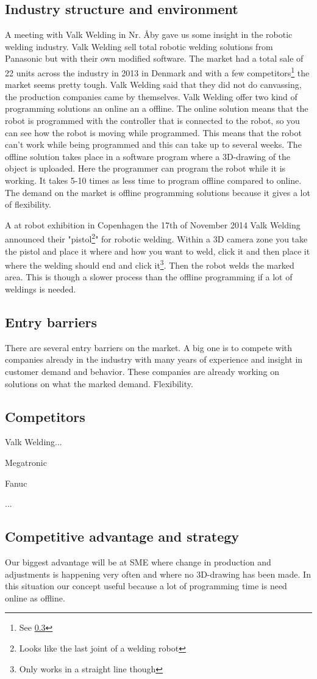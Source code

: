
\subsection{Industry structure and environment}
A meeting with Valk Welding in Nr. Åby gave us some insight in the robotic welding industry. Valk Welding sell total robotic welding solutions from Panasonic but with their own modified software. The market had  a total sale of 22 units across the industry in 2013 in Denmark and with a few competitors\footnote{See \ref{competitors}} the market seems pretty tough. Valk Welding said that they did not do canvassing, the production companies came by themselves. Valk Welding offer two kind of programming solutions an online an a offline. The online solution means that the robot is programmed with the controller that is connected to the robot, so you can see how the robot is moving while programmed. This means that the robot can't work while being programmed and this can take up to several weeks. The offline solution takes place in a software program where a 3D-drawing of the object is uploaded. Here the programmer can program the robot while it is working. It takes 5-10 times as less time to program offline compared to online. The demand on the market is offline programming solutions because it gives a lot of flexibility.

A at robot exhibition in Copenhagen the 17th of November 2014 Valk Welding announced their "pistol\footnote{Looks like the last joint of a welding robot}" for robotic welding. Within a 3D camera zone you take the pistol and place it where and how you want to weld, click it and then place it where the welding should end and click it\footnote{Only works in a straight line though}. Then the robot welds the marked area. This is though a slower process than the offline programming if a lot of weldings is needed.
\subsection{Entry barriers}
There are several entry barriers on the market. A big one is to compete with companies already in the industry with many years of experience and insight in customer demand and behavior. These companies are already working on solutions on what the marked demand. Flexibility.
\subsection{Competitors}
\label{competitors}
Valk Welding...

Megatronic

Fanuc

...
\subsection{Competitive advantage and strategy}
Our biggest advantage will be at SME where change in production and adjustments is happening very often and where no 3D-drawing has been made. In this situation our concept useful because a lot of programming time is need online as offline.

